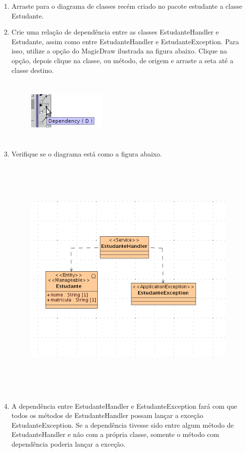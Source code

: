 \begin{enumerate}
\item Arraste para o diagrama de classes recém criado no pacote estudante a
classe Estudante.
	
\item Crie uma relação de dependência entre as classes EstudanteHandler e
Estudante, assim como entre EstudanteHandler e EstudanteException. Para isso,
utilize a opção do MagicDraw ilustrada na figura abaixo. Clique na opção,
depois clique na classe, ou método, de origem e arraste a seta até a classe
destino.
\begin{figure}[!htb]
	\centering
	\includegraphics[width=110pt,height=90pt]{imgs/tutorial-mdarte-0012.png}
\end{figure}

\item Verifique se o diagrama está como a figura abaixo.
\begin{figure}[!htb]
	\centering
	\includegraphics[width=300pt,height=350pt]{imgs/tutorial-mdarte-0011.png}
\end{figure}

\item A dependência entre EstudanteHandler e EstudanteException fará com que
todos os métodos de EstudanteHandler possam lançar a exceção EstudanteException.
Se a dependência tivesse sido entre algum método de EstudanteHandler e não com a
própria classe, somente o método com dependência poderia lançar a exceção.


\end{enumerate}
